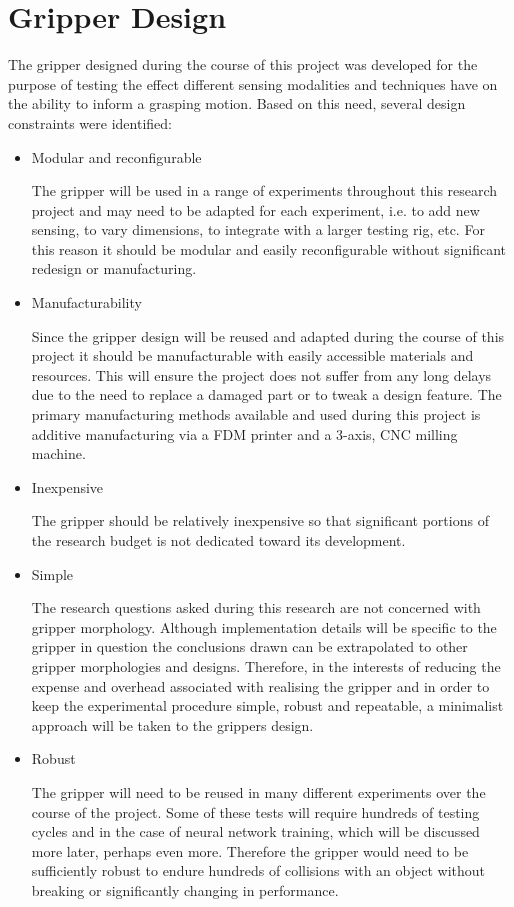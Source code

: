 \chapter{Gripper Design} \label{Chapter:GripperDesign}

The gripper designed during the course of this project was developed for the purpose of testing the effect different sensing modalities and techniques have on the ability to inform a grasping motion. Based on this need, several design constraints were identified:

\begin{itemize}
    \item Modular and reconfigurable
    
    The gripper will be used in a range of experiments throughout this research project and may need to be adapted for each experiment, i.e. to add new sensing, to vary dimensions, to integrate with a larger testing rig, etc. For this reason it should be modular and easily reconfigurable without significant redesign or manufacturing.
    \item Manufacturability
    
    Since the gripper design will be reused and adapted during the course of this project it should be manufacturable with easily accessible materials and resources. This will ensure the project does not suffer from any long delays due to the need to replace a damaged part or to tweak a design feature. The primary manufacturing methods available and used during this project is additive manufacturing via a FDM printer and a 3-axis, CNC milling machine.
    \item Inexpensive
    
    The gripper should be relatively inexpensive so that significant portions of the research budget is not dedicated toward its development.
    \item Simple
    
    The research questions asked during this research are not concerned with gripper morphology. Although implementation details will be specific to the gripper in question the conclusions drawn can be extrapolated to other gripper morphologies and designs. Therefore, in the interests of reducing the expense and overhead associated with realising the gripper and in order to keep the experimental procedure simple, robust and repeatable, a minimalist approach will be taken to the grippers design.
    \item Robust
    
    The gripper will need to be reused in many different experiments over the course of the project. Some of these tests will require hundreds of testing cycles and in the case of neural network training, which will be discussed more later, perhaps even more. Therefore the gripper would need to be sufficiently robust to endure hundreds of collisions with an object without breaking or significantly changing in performance.
\end{itemize}

